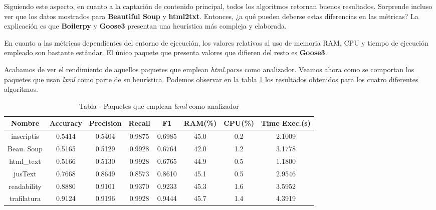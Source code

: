 Siguiendo este aspecto, en cuanto a la captación de contenido principal, todos los algoritmos retornan
buenos resultados. Sorprende incluso ver que los datos mostrados para \textbf{Beautiful Soup} y 
\textbf{html2txt}. Entonces, ¿a qué pueden deberse estas diferencias en las métricas? La explicación es
que \textbf{Boilerpy} y \textbf{Goose3} presentan una heurística más compleja y elaborada.

En cuanto a las métricas dependientes del entorno de ejecución, los valores relativos al uso de memoria
RAM, CPU y tiempo de ejecución empleado son bastante estándar. El único paquete que presenta valores que
difieren del resto es \textbf{Goose3}.

Acabamos de ver el rendimiento de aquellos paquetes que emplean \emph{html.parse} como analizador. Veamos
ahora como se comportan los paquetes que usan \emph{lxml} como parte de su heurística. Podemos observar en 
la tabla \ref{tab:tabla - paquetes que emplean lxml como analizador} los resultados obtenidos para los 
cuatro diferentes algoritmos.

\begin{table}[h]
    \begin{center}
      \begin{tabular}{| c | c | c | c | c | c | c | c |} \hline 
       \textbf{Nombre} & \textbf{Accuracy} & \textbf{Precision}  & \textbf{Recall} & \textbf{F1} & \textbf{RAM(\%)} & \textbf{CPU(\%)} & \textbf{Time Exec.(s)} \\ \hline
       inscriptis & 0.5414 & 0.5404 & 0.9875 & 0.6985 & 45.0 & 0.2 & 2.1009 \\ \hline
       Beau. Soup & 0.5165 & 0.5129 & 0.9928 & 0.6764 & 42.0 & 1.2 & 3.1778 \\ \hline
       html\_text & 0.5166 & 0.5130 & 0.9928 & 0.6765 & 44.9 & 0.5 & 1.1800 \\ \hline
       jusText & 0.7668 & 0.8649 & 0.8573 & 0.8610 & 45.1 & 0.5 & 2.9546 \\ \hline
       readability & 0.8880 & 0.9101 & 0.9370 & 0.9233 & 45.3 & 1.6 & 3.5952 \\ \hline
       trafilatura & 0.9124 & 0.9196 & 0.9928 & 0.9444 & 45.7 & 1.4 & 4.3919 \\ \hline
      \end{tabular}
      \caption{Tabla - Paquetes que emplean \emph{lxml} como analizador}
      \label{tab:tabla - paquetes que emplean lxml como analizador}
    \end{center}
\end{table}

